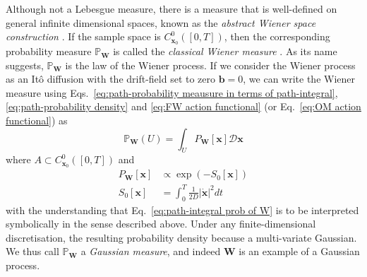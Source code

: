 
Although not a Lebesgue measure, there is a measure that is well-defined on general infinite dimensional spaces, known as the \textit{abstract Wiener space construction} \citep{grossAbstractWienerSpaces1967, MeasureIntegrationTheory1972}. If the sample space is $C_{\mathbf{x}_0}^0([0,T])$, then the corresponding probability measure $\mathbb{P}_\mathbf{W}$ is called the \textit{classical Wiener measure} \citep{cameronTransformationsWeinerIntegrals1944b, cameronTransformationsWienerIntegrals1945a}. As its name suggests, $\mathbb{P}_\mathbf{W}$ is the law of the Wiener process. If we consider the Wiener process as an It\^{o} diffusion with the drift-field set to zero $\mathbf{b} = 0$, we can write the Wiener measure using Eqs.~\ref{eq:path-probability meausure in terms of path-integral}, \ref{eq:path-probability density} and \ref{eq:FW action functional} (or Eq.~\ref{eq:OM action functional}) as
\begin{equation} \label{eq:path-integral prob of W}
\mathbb{P}_\mathbf{W}(U) = \int_U P_\mathbf{W}[\mathbf{x}] \mathcal{D} \mathbf{x}
\end{equation}
where $A \subset C_{\mathbf{x}_0}^0([0,T])$ and
\begin{subequations}
\begin{align}
P_\mathbf{W}[\mathbf{x}] & \propto \exp( - S_0[\mathbf{x}] ) \\
S_0[\mathbf{x}] & = \int_0^T \frac{1}{2D} |\dot{\mathbf{x}}|^2 dt
\end{align}
\end{subequations}
with the understanding that Eq.~\ref{eq:path-integral prob of W} is to be interpreted symbolically in the sense described above. Under any finite-dimensional discretisation, the resulting probability density because a multi-variate Gaussian. We thus call $\mathbb{P}_\mathbf{W}$ a \textit{Gaussian measure}, and indeed $\mathbf{W}$ is an example of a Gaussian process.


